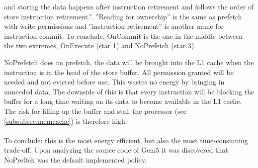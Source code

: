  and storing the data happens after instruction retirement and follows the order of store
instruction retirement.”. ”Reading for ownership” is the same as prefetch with write
permissions and ”instruction retirement” is another name for instruction commit. To
conclude, OnCommit is the one in the middle between the two extremes, OnExecute
(star 1) and NoPrefetch (star 3).

 NoPrefetch does no prefetch, the data will be brought into
the L1 cache when the instruction is in the head of the store buffer. All permission
granted will be needed and not evicted before use. This wastes no energy by bringing
in unneeded data. The downside of this is that every instruction will be blocking the
buffer for a long time waiting on its data to become available in the L1 cache. The
risk for filling up the buffer and stall the processor (see \ref{subsubsec:memcache}) is therefore high.
\\ \\
To conclude: this is the most energy efficient, but also the most time-consuming
trade-off. Upon analyzing the source code of Gem5 \cite{gem5} it was discovered that NoPreftch was the default implemented policy.


